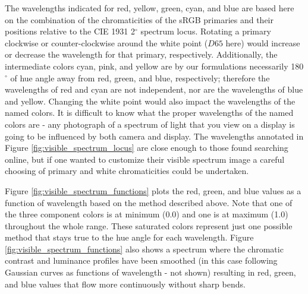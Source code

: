 \documentclass{article}
\begin{document}
\begin{multicols}{2}
The wavelengths indicated for red, yellow, green, cyan, and blue are based here on the combination of the chromaticities of the sRGB primaries and their positions relative to the CIE 1931 2$^\circ$ spectrum locus.  Rotating a primary clockwise or counter-clockwise around the white point ($D65$ here) would increase or decrease the wavelength for that primary, respectively.  Additionally, the intermediate colors cyan, pink, and yellow are by our formulations necessarily 180$^\circ$ of hue angle away from red, green, and blue, respectively; therefore the wavelengths of red and cyan are not independent, nor are the wavelengths of blue and yellow.  Changing the white point would also impact the wavelengths of the named colors.  It is difficult to know what the proper wavelengths of the named colors are - any photograph of a spectrum of light that you view on a display is going to be influenced by both camera and display.  The wavelengths annotated in Figure \ref{fig:visible_spectrum_locus} are close enough to those found searching online, but if one wanted to customize their visible spectrum image a careful choosing of primary and white chromaticities could be undertaken.

Figure \ref{fig:visible_spectrum_functions} plots the red, green, and blue values as a function of wavelength based on the method described above.  Note that one of the three component colors is at minimum (0.0) and one is at maximum (1.0) throughout the whole range.  These saturated colors represent just one possible method that stays true to the hue angle for each wavelength.  Figure \ref{fig:visible_spectrum_functions} also shows a spectrum where the chromatic contrast and luminance profiles have been smoothed (in this case following Gaussian curves as functions of wavelength - not shown) resulting in red, green, and blue values that flow more continuously without sharp bends.


\end{multicols}
\end{document}
